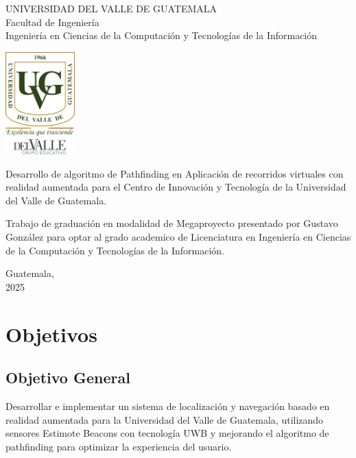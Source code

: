 \documentclass{article}
\begin{document}
\begin{center}
    \begin{doublespace}
        \thispagestyle{empty}  %
        \Large{UNIVERSIDAD DEL VALLE DE GUATEMALA}\\
        Facultad de Ingeniería \\
        Ingeniería en Ciencias de la Computación y Tecnologías de la Información 
    
        \vspace{15mm} 
        \includegraphics[width=0.2\textwidth]{images/Uvg_logo.jpg}
    
        \vspace{15mm} 
        {\Large Desarrollo de algoritmo de Pathfinding en Aplicación de recorridos virtuales con realidad aumentada para el Centro de Innovación y Tecnología de la Universidad del Valle de Guatemala.}
    
        \vspace{10mm} 
        {\Large Trabajo de graduación en modalidad de Megaproyecto presentado por Gustavo González
        para optar al grado academico de Licenciatura en Ingeniería en Ciencias de la Computación y Tecnologías de la Información.}
    
        {\Large Guatemala, \\ 2025}
        
    \end{doublespace}
    \end{center}




\setcounter{page}{1} %

\section{Objetivos}
\subsection{Objetivo General}
{\justify Desarrollar e implementar un sistema de localización y navegación basado en realidad aumentada para la Universidad 
del Valle de Guatemala, utilizando sensores Estimote Beacons con tecnología UWB y mejorando el algoritmo de pathfinding para 
optimizar la experiencia del usuario.}
\end{document}
